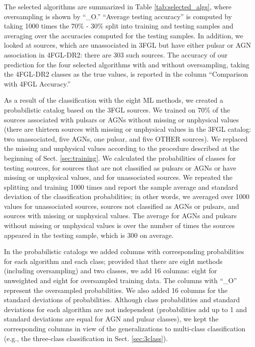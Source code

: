 \documentclass[referee]{aa} %
\begin{document}
The selected algorithms are summarized in Table \ref{tab:selected_algs}, where oversampling is shown by ``\_O.''
``Average testing accuracy'' is computed by taking 1000 times the 70\% - 30\% split into training and testing samples and averaging over the 
accuracies computed for the testing samples.
In addition, we looked at sources, which are unassociated in 3FGL but have either pulsar or AGN association in 4FGL-DR2: there are 303 such sources.
The accuracy of our prediction for the four selected algorithms with and without oversampling, taking the 4FGL-DR2 classes as the true values, is reported in the column ``Comparison with 4FGL Accuracy.''

As a result of the classification with the eight ML methods,
we created a probabilistic catalog based on the 3FGL sources.
We trained on 70\% of the sources associated with pulsars or AGNs without missing or unphysical values 
(there are thirteen sources with missing or unphysical values in the 3FGL catalog: two unassociated, five AGNs, one pulsar, and five OTHER sources).
We replaced the missing and unphysical values according to the procedure described at the beginning of Sect. \ref{sec:training}.
We calculated the probabilities of classes for testing sources, for sources that are not classified as pulsars or AGNs or have missing or unphysical values, and for unassociated sources.
We repeated the splitting and training 1000 times and report the sample average and standard deviation of the classification probabilities; in other words, we averaged over 1000 values for unassociated sources, sources not classified as AGNs or pulsars, and sources with missing or unphysical values. The average for AGNs and pulsars without missing or unphysical values is over the number of times the sources appeared in the testing sample, which is 300 on average.


In the probabilistic catalogs we added columns with corresponding probabilities for each algorithm and each class; provided that there are eight methods (including oversampling) and two classes, we add 16 columns: eight for unweighted and eight for oversampled training data. The columns with ``\_O'' represent the oversampled probabilities. We also added 16 columns for the standard deviations of probabilities. Although class probabilities and standard deviations for each algorithm are not independent (probabilities add up to 1 and standard deviations are equal for AGN and pulsar classes), we kept the corresponding columns in view of the generalizations to multi-class classification (e.g., the three-class classification in Sect. \ref{sec:3class}).
\end{document}
